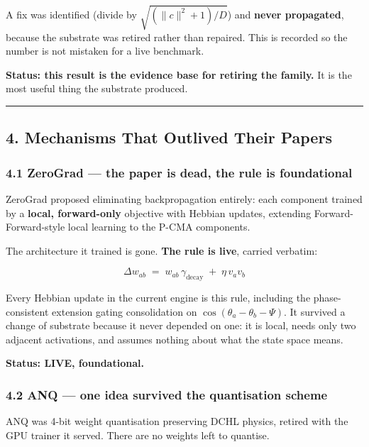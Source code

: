 \documentclass[
  11pt,
  a4paper,
]{article}
\begin{document}
A fix was identified (divide by \(\sqrt{(\lVert c\rVert^2+1)/D}\)) and
\textbf{never propagated}, because the substrate was retired rather than
repaired. This is recorded so the number is not mistaken for a live
benchmark.

\textbf{Status: this result is the evidence base for retiring the
family.} It is the most useful thing the substrate produced.

\begin{center}\rule{0.5\linewidth}{0.5pt}\end{center}

\subsection{4. Mechanisms That Outlived Their
Papers}\label{mechanisms-that-outlived-their-papers}

\subsubsection{4.1 ZeroGrad --- the paper is dead, the rule is
foundational}\label{zerograd-the-paper-is-dead-the-rule-is-foundational}

ZeroGrad proposed eliminating backpropagation entirely: each component
trained by a \textbf{local, forward-only} objective with Hebbian
updates, extending Forward-Forward-style local learning to the P-CMA
components.

The architecture it trained is gone. \textbf{The rule is live}, carried
verbatim:

\[
\Delta w_{ab} \;=\; w_{ab}\,\gamma_{\text{decay}} \;+\; \eta\, v_a v_b
\]

Every Hebbian update in the current engine is this rule, including the
phase-consistent extension gating consolidation on
\(\cos(\theta_a - \theta_b - \Psi)\). It survived a change of substrate
because it never depended on one: it is local, needs only two adjacent
activations, and assumes nothing about what the state space means.

\textbf{Status: LIVE, foundational.}

\subsubsection{4.2 ANQ --- one idea survived the quantisation
scheme}\label{anq-one-idea-survived-the-quantisation-scheme}

ANQ was 4-bit weight quantisation preserving DCHL physics, retired with
the GPU trainer it served. There are no weights left to quantise.
\end{document}
